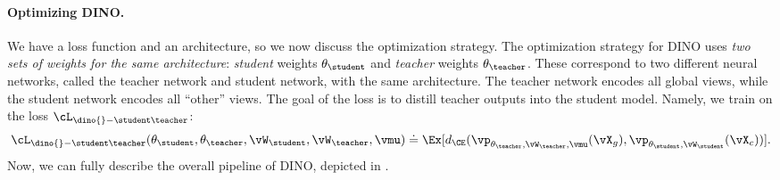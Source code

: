 \documentclass[../../book-main.tex]{subfiles}
\begin{document}
\paragraph{Optimizing DINO.} We have a loss function and an
architecture, so we now discuss the optimization strategy. The
optimization strategy for DINO uses \textit{two sets of weights for
the same architecture}: \textit{student} weights
\(\theta_{\student}\) and \textit{teacher} weights
\(\theta_{\teacher}\). These correspond to two different neural
networks, called the teacher network and student network, with the
same architecture. The teacher network encodes all global views,
while the student network encodes all ``other'' views. The goal of
the loss is to distill teacher outputs into the student model.
Namely, we train on the loss \(\cL_{\dino{}-\student\teacher}\):
\begin{equation}\label{eq:dino_loss_teacherstudent}
    \cL_{\dino{}-\student\teacher}(\theta_{\student},
    \theta_{\teacher}, \vW_{\student}, \vW_{\teacher}, \vmu) \doteq
    \Ex[d_{\CE}(\vp_{\theta_{\teacher}, \vW_{\teacher},
    \vmu}(\vX_{g}), \vp_{\theta_{\student}, \vW_{\student}}(\vX_{c}))].
\end{equation}
Now, we can fully describe the overall pipeline of DINO, depicted in
.
\end{document}
